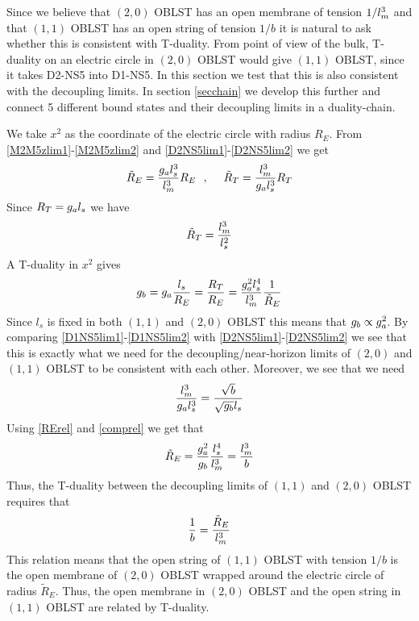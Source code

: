\documentclass[a4paper,twoside,titlepage,12pt]{article}
\begin{document}
Since we believe that $(2,0)$ OBLST has an open membrane of tension
$1/l_m^3$ and that $(1,1)$ OBLST has an open string of tension
$1/b$ it is natural to ask whether this is consistent with T-duality.
From point of view of the bulk, T-duality on an electric circle 
in $(2,0)$ OBLST would give $(1,1)$ OBLST, since it takes
D2-NS5 into D1-NS5. 
In this section we test that this is also consistent with the 
decoupling limits. 
In section \ref{secchain} we develop this further and connect
5 different bound states and their decoupling limits
in a duality-chain.

We take $x^2$ as the coordinate of the electric circle with 
radius $R_E$. 
From \eqref{M2M5zlim1}-\eqref{M2M5zlim2} and 
\eqref{D2NS5lim1}-\eqref{D2NS5lim2} we get
%
\begin{equation}
\tilde{R}_E = \frac{g_a l_s^3}{l_m^3} R_E
\ \ ,\ \ \ \ 
\tilde{R}_T = \frac{l_m^3}{g_a l_s^3} R_T
\end{equation}
%
Since \( R_T = g_a l_s \) we have
%
\begin{equation}
\tilde{R}_T = \frac{l_m^3}{l_s^2}
\end{equation}
%
A T-duality in $x^2$ gives
%
\begin{equation}
\label{RErel}
g_b = g_a \frac{l_s}{R_E} = \frac{R_T}{R_E} 
= \frac{g_a^2 l_s^4}{l_m^3} \frac{1}{\tilde{R}_E}
\end{equation}
%
Since \( l_s \) is fixed in both $(1,1)$ and $(2,0)$ OBLST
this means that \( g_b \propto g_a^2 \). By comparing
\eqref{D1NS5lim1}-\eqref{D1NS5lim2} with
\eqref{D2NS5lim1}-\eqref{D2NS5lim2} 
we see that this is exactly what we need for the decoupling/near-horizon
limits of $(2,0)$ and $(1,1)$ OBLST to be consistent with each other. 
Moreover, we see that we need
%
\begin{equation}
\label{comprel}
\frac{l_m^3}{g_a l_s^3} = \frac{\sqrt{b}}{\sqrt{g_b} l_s}
\end{equation}
%
Using \eqref{RErel} and \eqref{comprel} we get that
%
\begin{equation}
\tilde{R}_E = \frac{g_a^2}{g_b} \frac{l_s^4}{l_m^3}
= \frac{l_m^3}{b}
\end{equation}
%
Thus, the T-duality between the decoupling limits of $(1,1)$ and $(2,0)$
OBLST requires that
%
\begin{equation}
\frac{1}{b} = \frac{\tilde{R}_E}{l_m^3}
\end{equation}
%
This relation means that the open string of $(1,1)$ OBLST with
tension $1/b$ is the open membrane of $(2,0)$ OBLST wrapped
around the electric circle of radius $\tilde{R}_E$. 
Thus, the open membrane in $(2,0)$ OBLST
and the open string in $(1,1)$ OBLST are related by T-duality.
\end{document}
